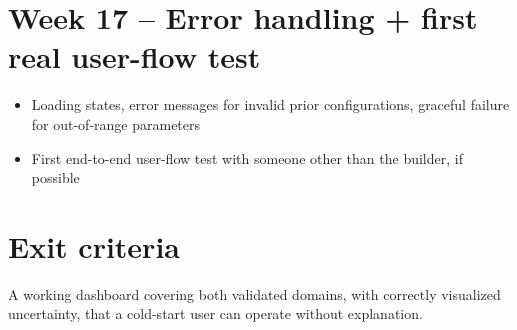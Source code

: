 \documentclass[11pt]{article}
\begin{document}
\section*{Week 17 -- Error handling + first real user-flow test}
\begin{itemize}[leftmargin=*]
  \item Loading states, error messages for invalid prior
    configurations, graceful failure for out-of-range parameters
  \item First end-to-end user-flow test with someone other than the
    builder, if possible
\end{itemize}

\section*{Exit criteria}
A working dashboard covering both validated domains, with correctly
visualized uncertainty, that a cold-start user can operate without
explanation.
\end{document}
